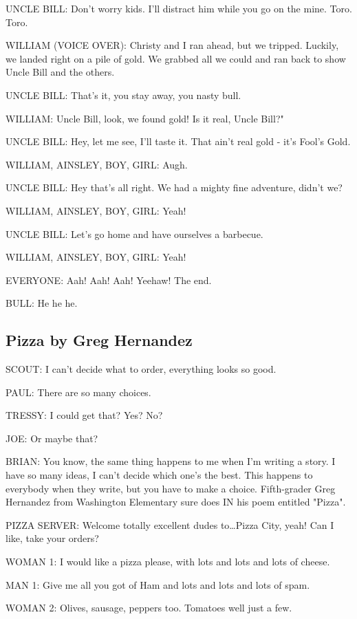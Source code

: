 UNCLE BILL:
Don't worry kids.
I'll distract him while you go on the mine.
Toro. Toro.

WILLIAM (VOICE OVER):
Christy and I ran ahead, but we tripped.
Luckily, we landed right on a pile of gold.
We grabbed all we could and ran back to show Uncle Bill and the others.

UNCLE BILL:
That's it, you stay away, you nasty bull.

WILLIAM:
Uncle Bill, look, we found gold!
Is it real, Uncle Bill?"

UNCLE BILL:
Hey, let me see, I'll taste it.
That ain't real gold - it's Fool's Gold.

WILLIAM, AINSLEY, BOY, GIRL:
Augh.

UNCLE BILL:
Hey that's all right.
We had a mighty fine adventure, didn't we?

WILLIAM, AINSLEY, BOY, GIRL:
Yeah!

UNCLE BILL:
Let's go home and have ourselves a barbecue.

WILLIAM, AINSLEY, BOY, GIRL:
Yeah!

EVERYONE:
Aah! Aah! Aah!
Yeehaw!
The end.

BULL:
He he he.

\subsection{Pizza by Greg Hernandez}

SCOUT:
I can't decide what to order, everything looks so good.

PAUL:
There are so many choices.

TRESSY:
I could get that? Yes? No?

JOE:
Or maybe that?

BRIAN:
You know, the same thing happens to me when I'm writing a story.
I have so many ideas, I can't decide which one's the best.
This happens to everybody when they write, but you have to make a choice.
Fifth-grader Greg Hernandez from Washington Elementary sure does IN his poem entitled "Pizza".

PIZZA SERVER:
Welcome totally excellent dudes to\dots Pizza City, yeah!
Can I like, take your orders?

WOMAN 1:
I would like a pizza please, with lots and lots and lots of cheese.

MAN 1:
Give me all you got of Ham and lots and lots and lots of spam.

WOMAN 2:
Olives, sausage, peppers too.
Tomatoes well just a few.

